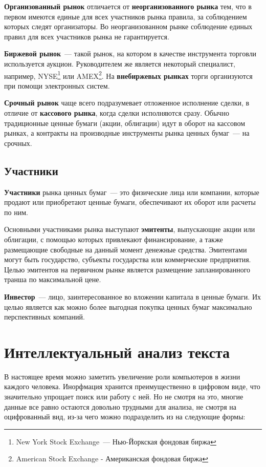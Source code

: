 \documentclass[14pt]{matmex-diploma-custom}
\begin{document}
\textbf{Организованный рынок} отличается от \textbf{неорганизованного рынка} тем, что в первом имеются единые для всех участников рынка правила, за соблюдением которых следят организаторы. Во неорганизованном рынке соблюдение единых правил для всех участников рынка не гарантируется.

\textbf{Биржевой рынок}~--- такой рынок, на котором в качестве инструмента торговли используется аукцион. Руководителем же является некоторый специалист, например, NYSE\footnote{New York Stock Exchange~--- Нью-Йоркская фондовая биржа} или AMEX\footnote{American Stock Exchange - Американская фондовая биржа}. На \textbf{внебиржевых рынках} торги организуются при помощи электронных систем.

\textbf{Срочный рынок} чаще всего подразумевает отложенное исполнение сделки, в отличие от \textbf{кассового рынка}, когда сделки исполняются сразу. Обычно традиционные ценные бумаги (акции, облигации) идут в оборот на кассовом рынках, а контракты на производные инструменты рынка ценных бумаг~--- на срочных.

\subsection{Участники}

\textbf{Участники} рынка ценных бумаг~--- это физические лица или компании, которые продают или приобретают ценные бумаги, обеспечивают их оборот или расчеты по ним. 

Основными участниками рынка выступают \textbf{эмитенты}, выпускающие акции или облигации, с помощью которых привлекают финансирование, а также размещающие свободные на данный момент денежные средства. Эмитентами могут быть государство, субъекты государства или коммерческие предприятия. Целью эмитентов на первичном рынке является размещение запланированного транша по максимальной цене.

\textbf{Инвестор}~--- лицо, заинтересованное во вложении капитала в ценные бумаги. Их целью является как можно более выгодная покупка ценных бумаг максимально перспективных компаний.

\clearpage\section{Интеллектуальный анализ текста}

В настоящее время можно заметить увеличение роли компьютеров в жизни каждого человека. Инорфмация хранится преимущественно в цифровом виде, что значительно упрощает поиск или работу с ней. Но не смотря на это, многие данные все равно остаются довольно трудными для анализа, не смотря на оцифрованный вид, из-за чего можно подразделить из на следующие формы:
\end{document}
